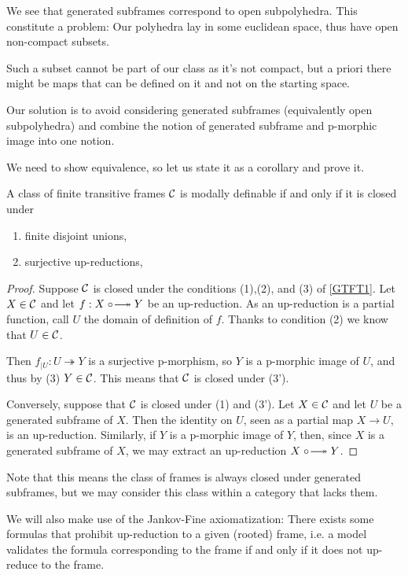 We see that generated subframes correspond to open subpolyhedra. This constitute a problem: Our polyhedra lay in some euclidean space, thus have open non-compact subsets.

Such a subset cannot be part of our class as it's not compact, but a priori there might be maps that can be defined on it and not on the starting space.

Our solution is to avoid considering generated subframes (equivalently open subpolyhedra) and combine the notion of generated subframe and p-morphic image into one notion.

We need to show equivalence, so let us state it as a corollary and prove it.
\begin{corollary}
    A class of finite transitive frames $\operatorname{\mathcal{C}}$ is modally definable if and only if it is closed under
    \begin{enumerate}
        \item finite disjoint unions,
        \item[(3')] surjective up-reductions,
    \end{enumerate}
\end{corollary}
\begin{proof}
    Suppose $\operatorname{\mathcal{C}}$ is closed under the conditions (1),(2), and (3) of \ref{GTFT1}. Let $X\in \operatorname{\mathcal{C}}$ and let $f:X\upred Y$ be an up-reduction. As an up-reduction is a partial function, call $U$ 
    the domain of definition of $f$. Thanks to condition (2) we know that $U\in \operatorname{\mathcal{C}}$.

    Then $f_{|U}: U\twoheadrightarrow Y$ is a surjective p-morphism, 
    so $Y$ is a p-morphic image of $U$, and thus by (3) $Y\in \operatorname{\mathcal{C}}$. 
    This means that $\operatorname{\mathcal{C}}$ is closed under (3').

    Conversely, suppose that $\operatorname{\mathcal{C}}$ is closed under (1) and (3'). 
    Let $X\in \operatorname{\mathcal{C}}$ and let $U$ be a generated subframe of 
    $X$. Then the identity on $U$, 
    seen as a partial map $X\to U$, is an up-reduction. 
    Similarly, if $Y$ is a p-morphic image of $Y$, then, 
    since $X$ is a generated subframe of $X$, we may extract an up-reduction $X\upred Y$.
\end{proof}

Note that this means the class of frames is always closed under generated subframes, but we may consider this class within a category that lacks them.

We will also make use of the Jankov-Fine axiomatization: There exists some formulas that prohibit up-reduction to a given (rooted) frame, i.e. a model validates 
the formula corresponding to the frame if and only if it does not up-reduce to the frame.

